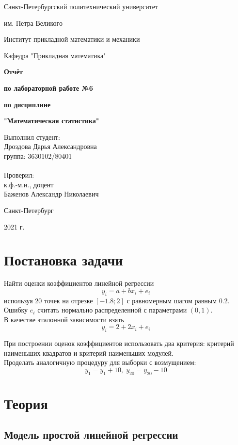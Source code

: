 \documentclass{article}
\begin{document}
\begin{titlepage}
  \centerline {Санкт-Петербургский политехнический университет}
  \centerline { им. Петра Великого}
  \centerline { }
  \centerline {Институт прикладной математики и механики} 
  \centerline {Кафедра "Прикладная математика"}
  \vfill
  \centerline{\textbf{Отчёт}}
  \centerline{\textbf{по лабораторной работе №6}}
  \centerline{\textbf{по дисциплине}}
  \centerline{\textbf{"Математическая статистика"}}
  \vfill
  \hfill
  \begin{minipage}{0.45\textwidth}
  Выполнил студент:\\
  Дроздова Дарья Александровна\\
  группа: 3630102/80401 \\
  \\
  Проверил:\\
  к.ф.-м.н., доцент \\
  Баженов Александр Николаевич
  \end{minipage}
  \vfill
  \centerline {Санкт-Петербург}   
  \centerline {2021 г.}  
\end{titlepage}

\newpage
\setcounter{page}{2}
\tableofcontents

\newpage
\listoffigures

\newpage
\section{Постановка задачи}

Найти оценки коэффициентов линейной регрессии
$$
y_i = a + bx_i + e_i
$$
используя 20 точек на отрезке $[-1.8; 2]$ с равномерным шагом равным 0.2. Ошибку $e_i$ считать нормально распределенной с параметрами $(0, 1)$. \\ 

В качестве эталонной зависимости взять
$$
y_i = 2 + 2x_i + e_i
$$ 

При построении оценок коэффициентов использовать два критерия: критерий наименьших квадратов и критерий наименьших модулей. \\

Проделать аналогичную процедуру для выборки с возмущением:
$$
y_1 = y_1 + 10, \; y_{20} = y_{20} - 10
$$

\newpage
\section{Теория}

\subsection{Модель простой линейной регрессии}
\end{document}
